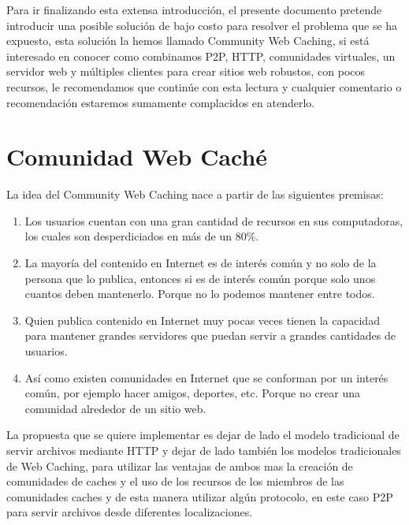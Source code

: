 Para ir finalizando esta extensa introducción, el presente documento pretende introducir una posible solución de bajo costo para resolver el problema que se ha expuesto, esta solución la hemos llamado Community Web Caching, si está interesado en conocer como combinamos P2P, HTTP, comunidades virtuales, un servidor web y múltiples clientes para crear sitios web robustos, con pocos recursos, le recomendamos que continúe con esta lectura y cualquier comentario o recomendación estaremos sumamente complacidos  en atenderlo.


\section{Comunidad Web Caché}

La idea del Community Web Caching nace a partir de las siguientes premisas:

\begin{enumerate}
\item Los usuarios cuentan con una gran cantidad de recursos en sus computadoras, los cuales son desperdiciados en más de un 80\%.
\item La mayoría del contenido en Internet es de interés común y no solo de la persona que lo publica, entonces si es de interés común porque solo unos cuantos deben mantenerlo. Porque no lo podemos mantener entre todos.
\item Quien publica contenido en Internet muy pocas veces tienen la capacidad para mantener grandes servidores que puedan  servir a grandes cantidades de usuarios.
\item Así como existen comunidades en Internet que se conforman por un interés común, por ejemplo hacer amigos, deportes, etc. Porque no crear una comunidad alrededor de un sitio web.
\marginpar{\myTitle \myVersion}
\end{enumerate}

La propuesta que se quiere implementar es dejar de lado el modelo tradicional de servir archivos mediante HTTP y dejar de lado también los modelos tradicionales de Web Caching, para utilizar las ventajas de ambos mas la creación de comunidades de caches y el uso de los recursos de los miembros de las comunidades caches y de esta manera utilizar algún protocolo, en este caso P2P para servir archivos desde diferentes localizaciones.

